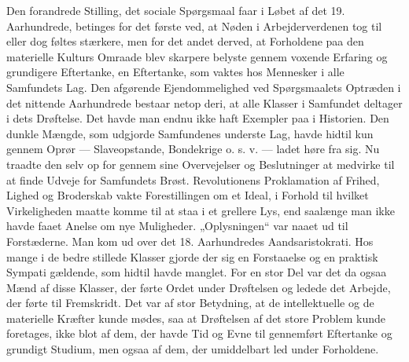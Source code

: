 \documentclass[12pt,a4paper,openany]{book}
\newcommand{\opage}[1]{\marginnote{\footnotesize\textit{[#1]}}}
\begin{document}
Den forandrede Stilling, det sociale Spørgsmaal faar i Løbet af
det 19. Aarhundrede, betinges for det første ved, at Nøden i Arbejderverdenen
tog til eller dog føltes stærkere, men for det andet derved,
at Forholdene paa den materielle Kulturs Omraade blev skarpere
belyste gennem voxende Erfaring og grundigere Eftertanke, en
Eftertanke, som vaktes hos Mennesker i alle Samfundets Lag. Den
afgørende Ejendommelighed ved Spørgsmaalets Optræden i det nittende
Aarhundrede bestaar netop deri, at alle Klasser i Samfundet
deltager i dets Drøftelse. Det havde man endnu ikke haft Exempler
paa i Historien. Den dunkle Mængde, som udgjorde Samfundenes
underste Lag, havde hidtil kun gennem Oprør --- Slaveopstande,
Bondekrige o. s. v. --- ladet høre fra sig. Nu traadte den selv op for
gennem sine Overvejelser og Beslutninger at medvirke til at finde
\opage{87}Udveje for Samfundets Brøst. Revolutionens Proklamation af Frihed,
Lighed og Broderskab vakte Forestillingen om et Ideal, i Forhold
til hvilket Virkeligheden maatte komme til at staa i et grellere
Lys, end saalænge man ikke havde faaet Anelse om nye Muligheder.
„Oplysningen“ var naaet ud til Forstæderne. Man kom ud over det
18. Aarhundredes Aandsaristokrati. Hos mange i de bedre stillede
Klasser gjorde der sig en Forstaaelse og en praktisk Sympati gældende,
som hidtil havde manglet. For en stor Del var det da ogsaa
Mænd af disse Klasser, der førte Ordet under Drøftelsen og ledede
det Arbejde, der førte til Fremskridt. Det var af stor Betydning, at
de intellektuelle og de materielle Kræfter kunde mødes, saa at Drøftelsen
af det store Problem kunde foretages, ikke blot af dem, der
havde Tid og Evne til gennemført Eftertanke og grundigt Studium,
men ogsaa af dem, der umiddelbart led under Forholdene.
\end{document}
